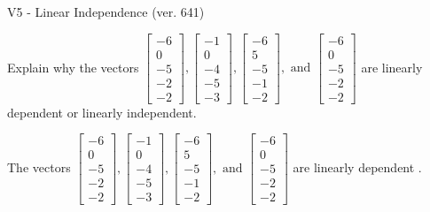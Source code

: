 \begin{exercise}
  \begin{exerciseTitle}V5 - Linear Independence (ver. 641)\end{exerciseTitle}
  \begin{exerciseStatement}
    Explain why the vectors \(\left[\begin{array}{r}
-6 \\
0 \\
-5 \\
-2 \\
-2
\end{array}\right] , \left[\begin{array}{r}
-1 \\
0 \\
-4 \\
-5 \\
-3
\end{array}\right] , \left[\begin{array}{r}
-6 \\
5 \\
-5 \\
-1 \\
-2
\end{array}\right] , \text{ and } \left[\begin{array}{r}
-6 \\
0 \\
-5 \\
-2 \\
-2
\end{array}\right]\) are linearly dependent or linearly independent.	


  \end{exerciseStatement}
  \begin{exerciseAnswer}
   The vectors \(\left[\begin{array}{r}
-6 \\
0 \\
-5 \\
-2 \\
-2
\end{array}\right] , \left[\begin{array}{r}
-1 \\
0 \\
-4 \\
-5 \\
-3
\end{array}\right] , \left[\begin{array}{r}
-6 \\
5 \\
-5 \\
-1 \\
-2
\end{array}\right] , \text{ and } \left[\begin{array}{r}
-6 \\
0 \\
-5 \\
-2 \\
-2
\end{array}\right]\) are 
  	 linearly dependent  .
  


  \end{exerciseAnswer}
\end{exercise}